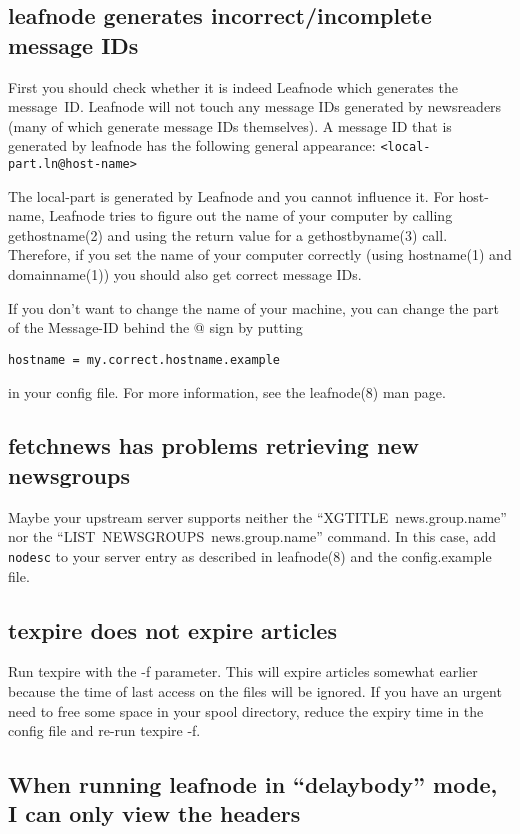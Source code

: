 \documentclass[10pt,english,a5paper]{article}
\begin{document}
\subsection{leafnode generates incorrect/incomplete message IDs}

   First you should check whether it is indeed Leafnode which generates
   the message~ID\@. Leafnode will not touch any message IDs generated by
   newsreaders (many of which generate message IDs themselves). A message
   ID that is generated by leafnode has the following general appearance:
   \verb+<local-part.ln@host-name>+

   The local-part is generated by Leafnode and you cannot influence it.
   For host-name, Leafnode tries to figure out the name of your computer
   by calling gethostname(2) and using the return value for a
   gethostbyname(3) call. Therefore, if you set the name of your computer
   correctly (using hostname(1) and domainname(1)) you should also get
   correct message IDs.

   If you don't want to change the name of your machine, you can change
   the part of the Message-ID behind the @ sign by putting
   \begin{verbatim}
hostname = my.correct.hostname.example
\end{verbatim} in your config file.
   For more information, see the leafnode(8) man page.

\subsection{fetchnews has problems retrieving new newsgroups}

   Maybe your upstream server supports neither the
   ``XGTITLE~news.group.name'' nor the
   ``LIST~NEWSGROUPS~news.group.name'' command. In
   this case, add \verb"nodesc" to your server entry as described in
   leafnode(8) and the config.example file.

\subsection{texpire does not expire articles}

   Run texpire with the -f parameter. This will expire articles somewhat
   earlier because the time of last access on the files will be ignored.
   If you have an urgent need to free some space in your spool directory,
   reduce the expiry time in the config file and re-run texpire -f.

\subsection{When running leafnode in ``delaybody'' mode, I can only
view the headers}
\end{document}
